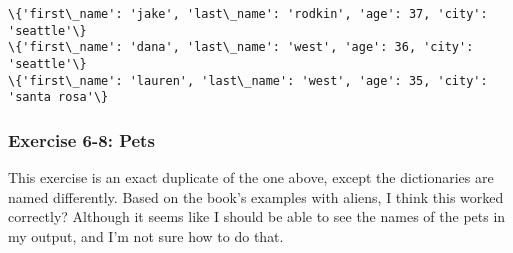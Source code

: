 \documentclass[11pt]{article}
\begin{document}
    \begin{Verbatim}[commandchars=\\\{\}]
\{'first\_name': 'jake', 'last\_name': 'rodkin', 'age': 37, 'city': 'seattle'\}
\{'first\_name': 'dana', 'last\_name': 'west', 'age': 36, 'city': 'seattle'\}
\{'first\_name': 'lauren', 'last\_name': 'west', 'age': 35, 'city': 'santa rosa'\}

    \end{Verbatim}

    \subsubsection{Exercise 6-8: Pets}\label{exercise-6-8-pets}

This exercise is an exact duplicate of the one above, except the
dictionaries are named differently. Based on the book's examples with
aliens, I think this worked correctly? Although it seems like I should
be able to see the names of the pets in my output, and I'm not sure how
to do that.
\end{document}
